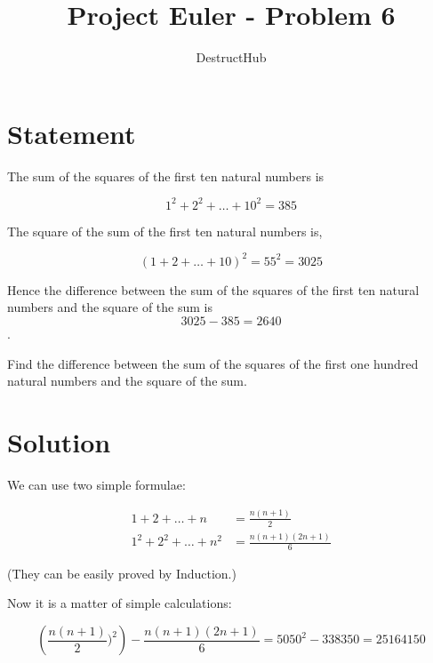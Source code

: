 \documentclass[a4paper,12pt]{article}
\title{Project Euler - Problem 6}
\date{}
\author{DestructHub}
\begin{document}
\maketitle

\section {Statement}

The sum of the squares of the first ten natural numbers is

$$ 1^2 + 2^2 + \ldots + 10^2 = 385 $$

The square of the sum of the first ten natural numbers is,

$$ (1 + 2 + \ldots + 10)^2 = 55^2 = 3025 $$

Hence the difference between the sum of the squares of the first ten natural
numbers and the square of the sum is $$ 3025 - 385 = 2640$$.

Find the difference between the sum of the squares of the first one hundred
natural numbers and the square of the sum.

\section{Solution}

We can use two simple formulae:

\begin{align*}
  1+2+\ldots+n &= \frac{n(n+1)}{2}\\
  1^2+2^2+\ldots+n^2 &= \frac{n(n+1)(2n+1)}{6}
\end{align*}

(They can be easily proved by Induction.)

Now it is a matter of simple calculations:

$$\left(\frac{n(n+1)}{2})^2\right) - \frac{n(n+1)(2n+1)}{6} = 5050^2-338350 = 25164150$$  
\end{document}
